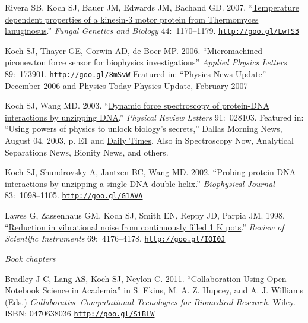 \documentclass[11pt]{article}
\begin{document}
\ind Rivera SB, Koch SJ, Bauer JM, Edwards JM, Bachand GD. 2007. ``\href{http://goo.gl/LwTS3}{Temperature dependent properties of a kinesin-3 motor protein from Thermomyces lanuginosus}.'' \emph{Fungal Genetics and Biology} 44:~1170–1179. {\scriptsize  \texttt{\href{http://goo.gl/LwTS3}{http://goo.gl/LwTS3}}}


\ind Koch SJ, Thayer GE, Corwin AD, de Boer MP. 2006. ``\href{http://goo.gl/8mSvW}{Micromachined piconewton force sensor for biophysics investigations}'' \newline \emph{Applied Physics Letters} 89:~173901. {\scriptsize  \texttt{\href{http://goo.gl/8mSvW}{http://goo.gl/8mSvW}}} \newline Featured in: \href{http://goo.gl/2m7LF}{“Physics News Update” December 2006} and \href{http://goo.gl/lYdCy}{Physics Today-Physics Update, February 2007}  


\ind Koch SJ, Wang MD. 2003. ``\href{http://goo.gl/XanG0}{Dynamic force spectroscopy of protein-DNA interactions by unzipping DNA}.'' \emph{Physical Review Letters} 91:~028103.  Featured in: “Using powers of physics to unlock biology's secrets,” Dallas Morning News, August 04, 2003, p. E1 and \href{http://goo.gl/2m7LF}{Daily Times}. Also in Spectroscopy Now, Analytical Separations News, Bionity News, and others.


\ind Koch SJ, Shundrovsky A, Jantzen BC, Wang MD. 2002.  ``\href{http://goo.gl/G1AVA}{Probing protein-DNA interactions by unzipping a single DNA double helix}.'' \emph{Biophysical Journal} 83:~1098–1105. {\scriptsize  \texttt{\href{http://goo.gl/G1AVA}{http://goo.gl/G1AVA}}}


\ind Lawes G, Zassenhaus GM, Koch SJ, Smith EN, Reppy JD, Parpia JM. 1998. ``\href{http://goo.gl/IOI0J}{Reduction in vibrational noise from continuously filled 1 K pots}.''  \emph{Review of Scientific Instruments}
69:~4176–4178. {\scriptsize  \texttt{\href{http://goo.gl/IOI0J}{http://goo.gl/IOI0J}}}



\bigskip

\noindent\emph{Book chapters \vspace{0.05in}}

\ind Bradley J-C, Lang AS, Koch SJ, Neylon C. 2011. ``Collaboration Using Open Notebook Science in Academia'' in S. Ekins, M. A. Z. Hupcey, and A. J. Williams (Eds.) \emph{Collaborative Computational Tecnologies for Biomedical Research}. Wiley. ISBN: 0470638036 {\scriptsize  \texttt{\href{http://goo.gl/SiBLW}{http://goo.gl/SiBLW}}}
\end{document}
